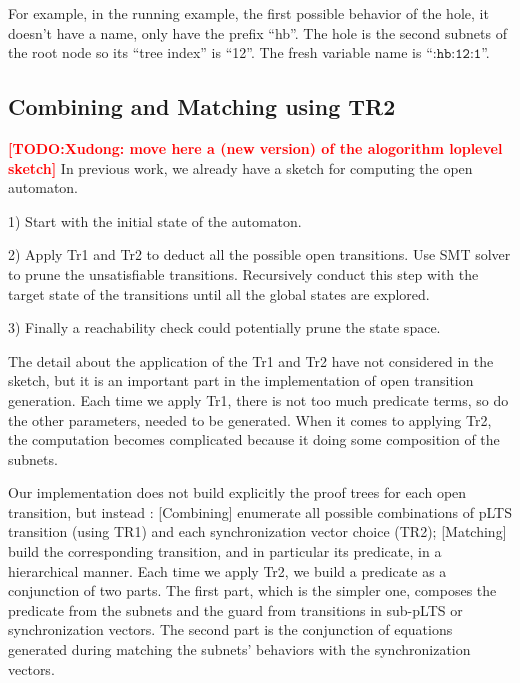\documentclass{lncs/llncs}
\newcommand{\TODO}[1]{\textcolor{red}{\textbf{[TODO:#1]}}}
\newcommand{\OTvar}{\texttt}
\newcommand{\QIN}[1]{\textcolor{airforceblue}{#1}}
\begin{document}
For example, in the running example, the first possible behavior of
the hole, it doesn't have a name, only have the prefix ``hb''. The
hole is the second subnets of the root node so its ``tree index'' is
``12''. The fresh variable name is ``$\OTvar{:hb:12:1}$''. 



\subsection{Combining and Matching using TR2}
\TODO{Xudong: move here a (new version) of the alogorithm loplevel sketch}
\QIN{
In previous work, we already have a sketch for computing the open automaton.
}

\QIN{
1) Start with the initial state of the automaton. 
}

\QIN{
2) Apply Tr1 and Tr2 to deduct all the possible open transitions. Use SMT solver to prune the 
unsatisfiable transitions. Recursively conduct this step with the target state of the transitions 
until all the global states are explored.
}

\QIN{
3) Finally a reachability check could potentially prune the state space.
}

\QIN{
The detail about the application of the Tr1 and Tr2 have not considered in the sketch, but it is an  
important part in the implementation of open transition generation. Each time we apply Tr1, there is not too much predicate terms, so do the other parameters, needed 
to be generated. When it comes to applying Tr2, the computation becomes complicated because it doing some composition of the subnets.
}

Our implementation does not build explicitly the proof trees for each
open transition, but instead : [Combining] enumerate all possible combinations of
pLTS transition (using TR1) and each synchronization vector choice
(TR2); [Matching] build the corresponding transition, and in particular
its predicate, in a hierarchical manner.
Each time we apply Tr2, we build a predicate as a conjunction of two
parts. The first part, which is the simpler one, composes the
predicate from the 
subnets and the guard from transitions in sub-pLTS or synchronization
vectors. The second part is the conjunction of equations generated
during matching the subnets' behaviors with the synchronization
vectors. 

 
\end{document}
